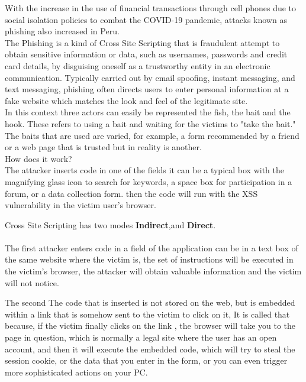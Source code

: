 \documentclass[12pt]{article}
\begin{document}
With the increase in the use of financial transactions through cell phones due to social isolation policies to combat the COVID-19 pandemic, attacks known as phishing also increased in Peru.\\

\newpage
The Phishing is a kind of Cross Site Scripting that  is  fraudulent attempt to obtain sensitive information or data, such as usernames, passwords and credit card details, by disguising oneself as a trustworthy entity in an electronic communication. Typically carried out by email spoofing, instant messaging, and text messaging, phishing often directs users to enter personal information at a fake website which matches the look and feel of the legitimate site.
\\

In this context
three actors can easily be represented
the fish, the bait and the hook.
These refers to using a bait and waiting for the victims to "take the bait." The baits that are used are varied, for example, a form recommended by a friend or a web page that is trusted but in reality is another.
\vspace{15PT}\\
How does it work?
\\

The attacker inserts code in one of the fields it can be
a typical box with the magnifying glass icon to search for keywords, a space box for participation in a forum, or a data collection form.
then the code will run with the XSS vulnerability in the victim user's browser.

Cross Site Scripting has two modes \textbf{Indirect},and  \textbf{Direct}.
\\
\\
The first attacker enters code in a field of the application can be in a text box of the same website where the victim is,
the set of instructions will be executed in the victim's browser, the attacker will obtain valuable information and the victim will not notice.

The second
The code that is inserted is not stored on the web, but is embedded within a link that is somehow sent to the victim to click on it, It is called that because, if the victim finally clicks on the link , the browser will take you to the page in question, which is normally a legal site where the user has an open account, and then it will execute the embedded code, which will try to steal the session cookie, or the data that you enter in the form, or you can even trigger more sophisticated actions on your PC.
\\
\end{document}
